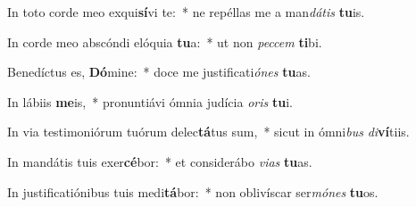 \item In toto corde meo exqui\textbf{sí}vi te:~* ne repéllas me a man\textit{dá}\textit{tis} \textbf{tu}is.
\item In corde meo abscóndi elóquia \textbf{tu}a:~* ut non \textit{pec}\textit{cem} \textbf{ti}bi.
\item Benedíctus es, \textbf{Dó}mine:~* doce me justificati\textit{ó}\textit{nes} \textbf{tu}as.
\item In lábiis \textbf{me}is,~* pronuntiávi ómnia judícia \textit{o}\textit{ris} \textbf{tu}i.
\item In via testimoniórum tuórum delec\textbf{tá}tus sum,~* sicut in ómni\textit{bus} \textit{di}\textbf{ví}tiis.
\item In mandátis tuis exer\textbf{cé}bor:~* et considerábo \textit{vi}\textit{as} \textbf{tu}as.
\item In justificatiónibus tuis medi\textbf{tá}bor:~* non oblivíscar ser\textit{mó}\textit{nes} \textbf{tu}os.
